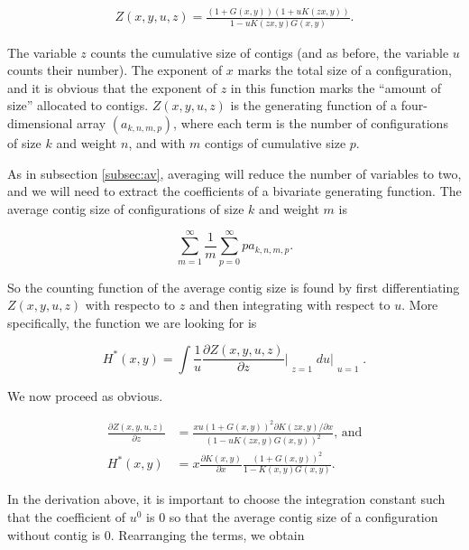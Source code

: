 \documentclass{article}
\begin{document}
\begin{equation*}
\begin{split}
Z(x,y,u,z) = \frac{(1+G(x,y))(1+uK(zx,y))}{1-uK(zx,y)G(x,y)}.
\end{split}
\end{equation*}

The variable $z$ counts the cumulative size of contigs (and as before, the
variable $u$ counts their number). The exponent of $x$ marks the total
size of a configuration, and it is obvious that the exponent of $z$ in
this function marks the ``amount of size'' allocated to contigs.
$Z(x,y,u,z)$ is the generating function of a four-dimensional array
$(a_{k,n,m,p})$, where each term is the number of configurations of size
$k$ and weight $n$, and with $m$ contigs of cumulative size $p$.

As in subsection \ref{subsec:av}, averaging will reduce the number of
variables to two, and we will need to extract the coefficients of a
bivariate generating function. The average contig size of configurations
of size $k$ and weight $m$ is

\begin{equation*}
\sum_{m=1}^\infty\frac{1}{m}\sum_{p=0}^\infty pa_{k,n,m,p}.
\end{equation*}

So the counting function of the average contig size is found by first
differentiating $Z(x,y,u,z)$ with respecto to $z$ and then integrating
with respect to $u$. More specifically, the function we are looking for is

\begin{equation*}
H^*(x,y) = \int \frac{1}{u}
\frac{\partial Z(x,y,u,z)}{\partial z}\Bigr|_{\substack{\\z=1}} du
\biggr|_{\substack{\\u=1}}.
\end{equation*}

We now proceed as obvious.

\begin{equation*}
\begin{split}
\frac{\partial Z(x,y,u,z)}{\partial z} &=
\frac{xu\left(1+G(x,y)\right)^2 \partial K(zx,y)/ \partial x}
{\left(1-uK(zx,y)G(x,y)\right)^2} \text{, and} \\
H^*(x,y) &=  x \frac{\partial K(x,y)}{\partial x}
\frac{\left(1+G(x,y)\right)^2}{1-K(x,y)G(x,y)}.
\end{split}
\end{equation*}

In the derivation above, it is important to choose the integration
constant such that the coefficient of $u^0$ is $0$ so that the average
contig size of a configuration without contig is $0$. Rearranging the
terms, we obtain
\end{document}
